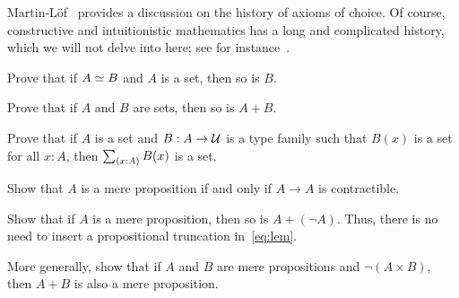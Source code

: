 Martin-L\"of~\cite{martin2006100} provides a discussion on the history of axioms of choice.
Of course, constructive and intuitionistic mathematics has a long and complicated history, which we will not delve into here; see for instance~\cite{TroelstraI,TroelstraII}.

\sectionExercises

\begin{ex}
  Prove that if $A \simeq B$ and $A$ is a set, then so is $B$.
\end{ex}

\begin{ex}\label{ex:isset-coprod}
  Prove that if $A$ and $B$ are sets, then so is $A+B$.
\end{ex}

\begin{ex}\label{ex:isset-sigma}
  Prove that if $A$ is a set and $B:A\to \mathcal{U}$ is a type family such that $B(x)$ is a set for all $x:A$, then $\sm{x:A} B(x)$ is a set.
\end{ex}

\begin{ex}\label{ex:prop-endocontr}
  Show that $A$ is a mere proposition if and only if $A\to A$ is contractible.
\end{ex}

\begin{ex}\label{ex:lem-mereprop}
  Show that if $A$ is a mere proposition, then so is $A+(\neg A)$.
  Thus, there is no need to insert a propositional truncation in~\eqref{eq:lem}.
\end{ex}

\begin{ex}\label{ex:disjoint-or}
  More generally, show that if $A$ and $B$ are mere propositions and $\neg(A\times B)$, then $A+B$ is also a mere proposition.
\end{ex}




